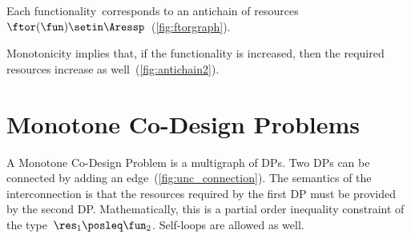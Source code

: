 
\noindent Each functionality~\fun corresponds to an antichain
of resources~$\ftor(\fun)\setin\Aressp$~(\cref{fig:ftorgraph}).


\noindent Monotonicity implies that, if the functionality is increased,
then the required resources increase as well~(\cref{fig:antichain2}).


\section{Monotone Co-Design Problems }

A Monotone Co-Design Problem is a multigraph of DPs.
Two DPs can be
connected by adding an edge~(\cref{fig:unc_connection}).
The semantics
of the interconnection is that the resources required by the first
DP must be provided by the second DP.
Mathematically, this is a partial
order inequality constraint of the type~$\res_{1}\posleq\fun_{2}$.
Self-loops are allowed as well.

